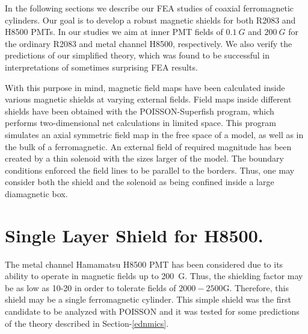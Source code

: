 \documentclass[12pt]{article}
\begin{document}
In the following  sections we describe our  FEA studies of coaxial ferromagnetic cylinders.
Our goal is to develop a  robust
magnetic shields for both  R2083 and H8500 PMTs. 
In our  studies we aim at inner PMT fields  of $0.1~G$ and $200~G$ for the ordinary R2083 and
metal channel  H8500, respectively.   We also  verify the predictions of our 
simplified theory, which was found to be successful in  interpretations of sometimes surprising FEA results.

With this purpose in mind, magnetic field maps have  been calculated
inside various magnetic shields at varying external fields.
Field maps inside different shields have been  obtained with 
the POISSON-Superfish  program,  which performs two-dimensional net calculations 
in  limited space.  This program  simulates an axial symmetric 
field map in the free space of a model, as well as in the 
bulk of a ferromagnetic. An external field of required magnitude has been
created by a thin solenoid with the sizes larger of the model.
The boundary conditions enforced the field lines to be parallel to the borders.
Thus, one may consider both the shield and the solenoid as being
confined inside a large diamagnetic box.
 
%





\section{Single Layer Shield for H8500.}
The metal channel Hamamatsu H8500 PMT has been 
considered due to its ability to operate in magnetic fields up to 200~G.
Thus, the shielding factor may be as low as 10-20 in order to tolerate
 fields of $2000-2500$G. Therefore, this shield may be a  single  ferromagnetic cylinder.  
This simple shield  was  the first candidate to be analyzed  with POISSON and  it
was  tested for some predictions of the  theory described in  Section-\ref{ednmics}.
\end{document}
